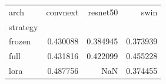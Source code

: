 \begin{tabular}{lrrr}
\toprule
arch & convnext & resnet50 & swin \\
strategy &  &  &  \\
\midrule
frozen & 0.430088 & 0.384945 & 0.373939 \\
full & 0.431816 & 0.422099 & 0.455228 \\
lora & 0.487756 & NaN & 0.374455 \\
\bottomrule
\end{tabular}
